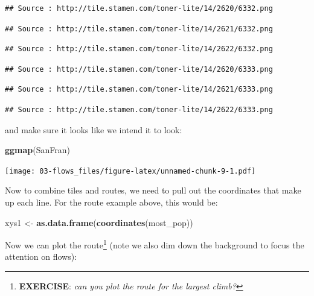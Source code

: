 \documentclass[]{book}
\newenvironment{Shaded}{\begin{snugshade}}{\end{snugshade}}
\newcommand{\KeywordTok}[1]{\textcolor[rgb]{0.13,0.29,0.53}{\textbf{#1}}}
\newcommand{\NormalTok}[1]{#1}
\newcommand{\StringTok}[1]{\textcolor[rgb]{0.31,0.60,0.02}{#1}}
\let\rmarkdownfootnote\footnote%
\def\footnote{\protect\rmarkdownfootnote}
\begin{document}
\begin{verbatim}
## Source : http://tile.stamen.com/toner-lite/14/2620/6332.png
\end{verbatim}

\begin{verbatim}
## Source : http://tile.stamen.com/toner-lite/14/2621/6332.png
\end{verbatim}

\begin{verbatim}
## Source : http://tile.stamen.com/toner-lite/14/2622/6332.png
\end{verbatim}

\begin{verbatim}
## Source : http://tile.stamen.com/toner-lite/14/2620/6333.png
\end{verbatim}

\begin{verbatim}
## Source : http://tile.stamen.com/toner-lite/14/2621/6333.png
\end{verbatim}

\begin{verbatim}
## Source : http://tile.stamen.com/toner-lite/14/2622/6333.png
\end{verbatim}

and make sure it looks like we intend it to look:

\begin{Shaded}
\begin{Highlighting}[]
\KeywordTok{ggmap}\NormalTok{(SanFran)}
\end{Highlighting}
\end{Shaded}

\texttt{[image: 03-flows\_files/figure-latex/unnamed-chunk-9-1.pdf]}

Now to combine tiles and routes, we need to pull out the coordinates that make up each line. For the route example above, this would be:

\begin{Shaded}
\begin{Highlighting}[]
\NormalTok{xys1 <-}\StringTok{ }\KeywordTok{as.data.frame}\NormalTok{(}\KeywordTok{coordinates}\NormalTok{(most_pop))}
\end{Highlighting}
\end{Shaded}

Now we can plot the route\footnote{\textbf{EXERCISE}: \emph{can you plot the route for the largest climb?}} (note we also dim down the background to focus the attention on flows):
\end{document}
